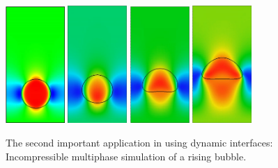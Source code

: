 \documentclass[a4paper,10pt]{report} %
\begin{document}
\begin{figure}[!h]
\begin{center}
\includegraphics[width=0.2\textwidth]{figures/Bubble_t0}
\includegraphics[width=0.2\textwidth]{figures/Bubble_t1}
\includegraphics[width=0.2\textwidth]{figures/Bubble_t2}
\includegraphics[width=0.2\textwidth]{figures/Bubble_t3}
\end{center}
\caption{
The second important application in \BoSSS{} using dynamic interfaces:
Incompressible multiphase simulation of a rising bubble.
}
\label{fig:Bubbles}
\end{figure}
\end{document}
